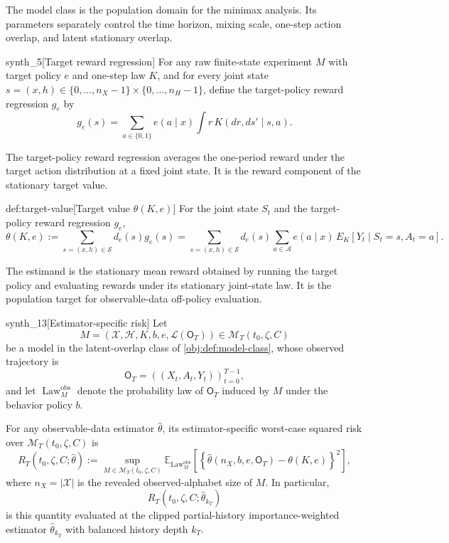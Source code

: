The model class  is the population domain for the minimax analysis. Its parameters separately control the time horizon, mixing scale, one-step action overlap, and latent stationary overlap.

\begin{definitionv}{synth_5}[Target reward regression]
For any raw finite-state experiment \(M\) with target policy \(e\) and one-step law \(K\), and for every joint state \(s=(x,h)\in \{0,\ldots,n_X-1\}\times\{0,\ldots,n_H-1\}\), define the target-policy reward regression \(g_e\) by
\[
g_e(s)
=
\sum_{a\in\{0,1\}} e(a\mid x)\int r\,K(d r,d s'\mid s,a).
\]
\end{definitionv}

The target-policy reward regression  averages the one-period reward under the target action distribution at a fixed joint state. It is the reward component of the stationary target value.

\begin{definitionv}{def:target-value}[Target value \(\theta(K,e)\)]
For the joint state \(S_t\) and the target-policy reward regression \(g_e\),
\[
\theta(K,e)
:=
\sum_{s=(x,h)\in\mathcal S} d_e(s)g_e(s)
=
\sum_{s=(x,h)\in\mathcal S} d_e(s)
\sum_{a\in\mathcal A}
e(a\mid x)\,E_K[Y_t\mid S_t=s,A_t=a].
\]
\end{definitionv}

The estimand  is the stationary mean reward obtained by running the target policy and evaluating rewards under its stationary joint-state law. It is the population target for observable-data off-policy evaluation.

\begin{definitionv}{synth_13}[Estimator-specific risk]
Let
\[
M=(\mathcal X,\mathcal H,K,b,e,\mathcal L(\mathsf O_T))
\in \mathcal M_T(t_0,\zeta,C)
\]
be a model in the latent-overlap class of \cref{obj:def:model-class}, whose observed trajectory is
\[
\mathsf O_T=((X_t,A_t,Y_t))_{t=0}^{T-1},
\]
and let \(\operatorname{Law}^{\mathrm{obs}}_M\) denote the probability law of \(\mathsf O_T\) induced by \(M\) under the behavior policy \(b\).

For any observable-data estimator \(\widehat\theta\), its estimator-specific worst-case squared risk over \(\mathcal M_T(t_0,\zeta,C)\) is
\[
R_T(t_0,\zeta,C;\widehat\theta)
:=
\sup_{M\in\mathcal M_T(t_0,\zeta,C)}
\mathbb E_{\operatorname{Law}^{\mathrm{obs}}_M}
\!\left[
\left\{\widehat\theta(n_X,b,e,\mathsf O_T)-\theta(K,e)\right\}^2
\right],
\]
where \(n_X=|\mathcal X|\) is the revealed observed-alphabet size of \(M\). In particular,
\[
R_T(t_0,\zeta,C;\widehat\theta_{k_T})
\]
is this quantity evaluated at the clipped partial-history importance-weighted estimator \(\widehat\theta_{k_T}\) with balanced history depth \(k_T\).
\end{definitionv}

